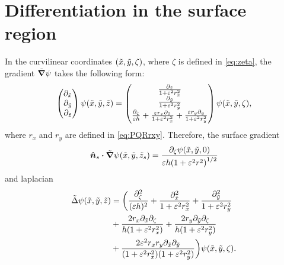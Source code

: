 \appendix

\section{Differentiation in the surface region}\label{sec:surface}

In the curvilinear coordinates $(\tilde{x},\tilde{y},\zeta)$, where $\zeta$ is defined in \cref{eq:zeta}, the gradient $\tilde\grad\psi$ takes the following form:
\begin{equation}\label{eq:gradS}
    \begin{pmatrix}
        \partial_{\tilde{x}} \\ \partial_{\tilde{y}} \\ \partial_{\tilde{z}}
    \end{pmatrix}\psi(\tilde{x},\tilde{y},\tilde{z}) =
    \begin{pmatrix}
        \frac{\partial_{\tilde{x}}}{1+\varepsilon^2r_x^2} \\ \frac{\partial_{\tilde{y}}}{1+\varepsilon^2r_y^2} \\
        \frac{\partial_\zeta}{\varepsilon h} + \frac{\varepsilon r_x\partial_{\tilde{x}}}{1+\varepsilon^2r_x^2}
        + \frac{\varepsilon r_y\partial_{\tilde{y}}}{1+\varepsilon^2r_y^2}
    \end{pmatrix}\psi(\tilde{x},\tilde{y},\zeta),
\end{equation}
where $r_x$ and $r_y$ are defined in \cref{eq:PQRrxy}. Therefore, the surface gradient
\begin{equation}\label{eq:ndotgradS}
    \bn_s\vdot\tgrad\psi(\tx,\tz_s)
        = \frac{\pzeta\psi(\tx,0)}{\eps h\qty(1 + \eps^2r^2)^{1/2}}
\end{equation}
and laplacian
\begin{equation}\label{eq:laplacianS}
    \begin{aligned}[b]
    \tilde\Delta\psi(\tilde{x},\tilde{y},\tilde{z}) &= \bigg(\frac{\partial_\zeta^2}{(\varepsilon h)^2}
        + \frac{\partial_{\tilde{x}}^2}{1+\varepsilon^2r_x^2} + \frac{\partial_{\tilde{y}}^2}{1+\varepsilon^2r_y^2} \\
        &+ \frac{2r_x\partial_{\tilde{x}}\partial_\zeta}{h(1+\varepsilon^2r_x^2)} + \frac{2r_y\partial_{\tilde{y}}\partial_\zeta}{h(1+\varepsilon^2r_y^2)} \\
        &+ \frac{2\varepsilon^2r_xr_y\partial_{\tilde{x}}\partial_{\tilde{y}}}{(1+\varepsilon^2r_x^2)(1+\varepsilon^2r_y^2)}\bigg)\psi(\tilde{x},\tilde{y},\zeta).
    \end{aligned}
\end{equation}

